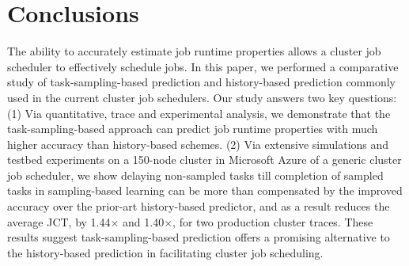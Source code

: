 \section{Conclusions}
\label{sec:conc}

The ability to accurately estimate job runtime properties allows a cluster job
scheduler to effectively schedule jobs.  In this paper, we performed a
comparative study of task-sampling-based prediction and history-based
prediction commonly used in the current cluster job schedulers. Our study
answers two key questions: (1) Via quantitative, trace and experimental
analysis, we demonstrate that the task-sampling-based approach can predict job
runtime properties with much higher accuracy than history-based schemes.  (2)
Via extensive simulations and testbed experiments on a 150-node cluster in
Microsoft Azure of a generic cluster job scheduler, we show delaying
non-sampled tasks till completion of sampled tasks in sampling-based learning
can be more than compensated by the improved accuracy over the prior-art
history-based predictor, and as a result reduces the average JCT, by
1.44$\times$ and 1.40$\times$, for two production cluster traces.
These results suggest task-sampling-based prediction offers a 
promising alternative to the history-based prediction in facilitating cluster
job scheduling. 

